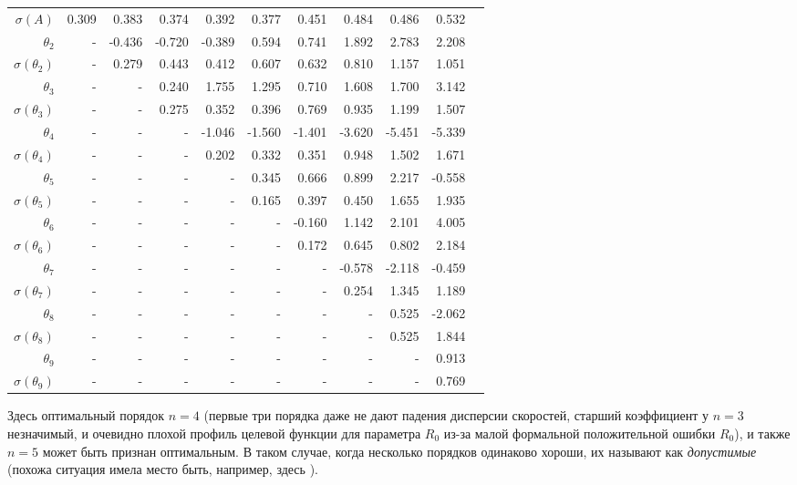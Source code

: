 \documentclass{matmex-diploma-custom}
\begin{document}
\begin{table}[h!!]
\begin{tabular}{r|rrr|rr|rrrrr}
 $\sigma(A) $ & 0.309       &   0.383 &   0.374 &   0.392 &   0.377 &   0.451 &   0.484 &   0.486 &   0.532 \\
 $\theta_2$&-        &  -0.436 &   -0.720 &  -0.389 &   0.594 &   0.741 &   1.892 &   2.783 &   2.208 \\
 $\sigma(\theta_2)$&-      &   0.279 &   0.443 &   0.412 &   0.607 &   0.632 &    0.810 &   1.157 &   1.051 \\
 $\theta_3$&-      &    - &   0.240 &   1.755 &   1.295 &   0.710 &   1.608 &   1.700 &   3.142 \\
 $\sigma(\theta_3)$&-      &    - &   0.275 &   0.352 &   0.396 &   0.769 &   0.935 &   1.199 &   1.507 \\
 $\theta_4$&-      &    - &    - &  -1.046 &  -1.560 &  -1.401 &  -3.620 &  -5.451 &  -5.339 \\
 $\sigma(\theta_4)$&-      &    - &    - &   0.202 &   0.332 &   0.351 &   0.948 &   1.502 &   1.671 \\
 $\theta_5$&-      &    - &    - &    - &  0.345 &   0.666 &   0.899 &   2.217 &  -0.558 \\
 $\sigma(\theta_5)$&-      &    - &    - &    - &   0.165 &   0.397 &   0.450 &   1.655 &   1.935 \\
 $\theta_6$&-      &    - &    - &    - &    - &   -0.160 &   1.142 &   2.101 &   4.005 \\
 $\sigma(\theta_6)$&-    &    - &    - &    - &    - &  0.172 &   0.645 &   0.802 &   2.184 \\
 $\theta_7$&-     &    - &    - &    - &    - &    - &  -0.578 &  -2.118 &  -0.459 \\
 $ \sigma(\theta_7)$&-     &    - &    - &    - &    - &    - &    0.254 &   1.345 &   1.189 \\
 $\theta_8$&-     &    - &    - &    - &    - &    - &    - &   0.525 &  -2.062 \\
 $ \sigma(\theta_8)$&-     &    - &    - &    - &    - &    - &    - &   0.525 &   1.844 \\
 $\theta_9$&-     &    - &    - &    - &    - &    - &    - &    - &  0.913 \\
 $ \sigma(\theta_9)$&-     &    - &    - &    - &    - &    - &    - &    - &   0.769 \\
\end{tabular}
\end{table}

\par Здесь оптимальный порядок $n=4$ (первые три порядка даже не дают падения дисперсии скоростей, старший коэффициент у $n=3$ незначимый, и очевидно плохой профиль целевой функции для параметра $R_0$ из-за малой формальной положительной ошибки $R_0$), и также $n =5$ может быть признан оптимальным. В таком случае, когда несколько порядков одинаково хороши, их называют как \textit{допустимые} (похожа ситуация имела место быть, например, здесь \cite{NII}).
\end{document}
